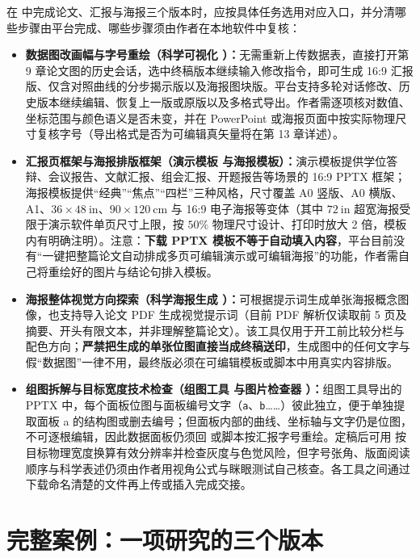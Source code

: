 在 \scidraw{} 中完成论文、汇报与海报三个版本时，应按具体任务选用对应入口，并分清哪些步骤由平台完成、哪些步骤须由作者在本地软件中复核：
\begin{itemize}
\item \textbf{数据图改画幅与字号重绘（科学可视化 ）：}无需重新上传数据表，直接打开第 9 章论文图的历史会话，选中终稿版本继续输入修改指令，即可生成 16:9 汇报版、仅含对照曲线的分步揭示版以及海报图块版。平台支持多轮对话修改、历史版本继续编辑、恢复上一版或原版以及多格式导出。作者需逐项核对数值、坐标范围与颜色语义是否未变，并在 PowerPoint 或海报页面中按实际物理尺寸复核字号（导出格式是否为可编辑真矢量将在第 13 章详述）。
\item \textbf{汇报页框架与海报排版框架（演示模板  与海报模板）：}演示模板提供学位答辩、会议报告、文献汇报、组会汇报、开题报告等场景的 16:9 PPTX 框架；海报模板提供“经典”“焦点”“四栏”三种风格，尺寸覆盖 A0 竖版、A0 横版、A1、$36\times 48\ \text{in}$、$90\times 120\ \text{cm}$ 与 16:9 电子海报等变体（其中 $72\ \text{in}$ 超宽海报受限于演示软件单页尺寸上限，按 $50\%$ 物理尺寸设计、打印时放大 2 倍，模板内有明确注明）。注意：\textbf{下载 PPTX 模板不等于自动填入内容}，平台目前没有“一键把整篇论文自动排成多页可编辑演示或可编辑海报”的功能，作者需自己将重绘好的图片与结论句排入模板。
\item \textbf{海报整体视觉方向探索（科学海报生成 ）：}可根据提示词生成单张海报概念图像，也支持导入论文 PDF 生成视觉提示词（目前 PDF 解析仅读取前 5 页及摘要、开头有限文本，并非理解整篇论文）。该工具仅用于开工前比较分栏与配色方向；\textbf{严禁把生成的单张位图直接当成终稿送印}，生成图中的任何文字与假“数据图”一律不用，最终版必须在可编辑模板或脚本中用真实内容排版。
\item \textbf{组图拆解与目标宽度技术检查（组图工具  与图片检查器 ）：}组图工具导出的 PPTX 中，每个面板位图与面板编号文字（\texttt{a}、\texttt{b}……）彼此独立，便于单独提取面板 a 的结构图或删去编号；但面板内部的曲线、坐标轴与文字仍是位图，不可逐根编辑，因此数据面板仍须回  或脚本按汇报字号重绘。定稿后可用  按目标物理宽度换算有效分辨率并检查灰度与色觉风险，但字号张角、版面阅读顺序与科学表述仍须由作者用视角公式与眯眼测试自己核查。各工具之间通过下载命名清楚的文件再上传或插入完成交接。
\end{itemize}

\section{完整案例：一项研究的三个版本}

